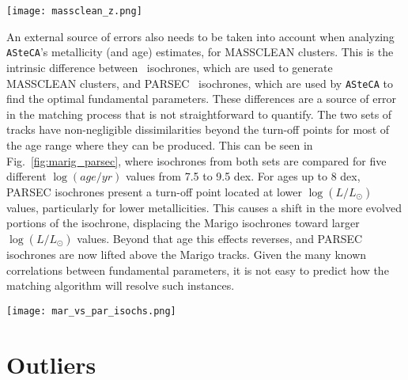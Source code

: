 \documentclass{aa}
\begin{document}
\begin{appendix}
\begin{figure*}
\texttt{[image: massclean\_z.png]}
\caption{\texttt{ASteCA} metallicity estimates for each mass used to generate
MASSCLEAN clusters. Colors are associated with $\log(age/yr)$ differences, shown
in the color bars to the right. The green dashed horizontal line is the $\Delta
[Fe/H]{=}0$ line, shown as reference.}
\label{fig:massclean_z}
\end{figure*}

An external source of errors also needs to be taken into account when analyzing
\texttt{ASteCA}'s metallicity (and age) estimates, for MASSCLEAN clusters.
%
This is the intrinsic difference between~\cite{Marigo_2008} isochrones, which
are used to generate MASSCLEAN clusters, and PARSEC~\citep{Bressan_2012}
isochrones, which are used by \texttt{ASteCA} to find the optimal fundamental
parameters. These differences are a source of error in the matching
process that is not straightforward to quantify.
%
The two sets of tracks have non-negligible dissimilarities beyond the turn-off
points for most of the age range where they can be produced. This can be seen
in Fig.~\ref{fig:marig_parsec}, where isochrones from both sets are compared for
five different $\log(age/yr)$ values from 7.5 to 9.5 dex.
%
For ages up to 8 dex, PARSEC isochrones present a turn-off point located at
lower $\log(L/L_{\odot})$ values, particularly for lower metallicities. This
causes a shift in the more evolved portions of the isochrone, displacing the
Marigo isochrones toward larger $\log(L/L_{\odot})$ values.
%
Beyond that age this effects reverses, and PARSEC isochrones are now lifted
above the Marigo tracks. Given the many known correlations between fundamental
parameters, it is not easy to predict how the matching algorithm will resolve
such instances.

\begin{figure*}
\texttt{[image: mar\_vs\_par\_isochs.png]}
\caption{\cite{Marigo_2008} vs. PARSEC~\citep{Bressan_2012} isochrones for
different metallicities and ages.}
\label{fig:marig_parsec}
\end{figure*}





\section{Outliers}
\label{apdx:outliers}


\end{appendix}
\end{document}
